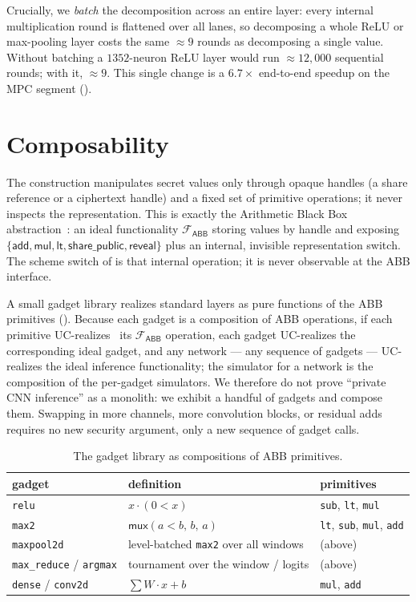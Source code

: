 \documentclass[11pt]{article}
\theoremstyle{plain}
\theoremstyle{definition}
\theoremstyle{remark}
\newcommand{\Fabb}{\mathcal{F}_{\mathsf{ABB}}}
\newcommand{\bt}[1]{\texttt{#1}}
\begin{document}
Crucially, we \emph{batch} the decomposition across an entire layer: every
internal multiplication round is flattened over all lanes, so decomposing a
whole ReLU or max-pooling layer costs the same $\approx 9$ rounds as
decomposing a single value. Without batching a $1352$-neuron ReLU layer
would run $\approx 12{,}000$ sequential rounds; with it, $\approx 9$. This
single change is a $6.7\times$ end-to-end speedup on the MPC segment
().

\section{Composability}\label{sec:uc}

The construction manipulates secret values only through opaque handles
(a share reference or a ciphertext handle) and a fixed set of primitive
operations; it never inspects the representation. This is exactly the
Arithmetic Black Box abstraction~\cite{DamgardNielsen,SPDZ}: an ideal
functionality $\Fabb$ storing values by handle and exposing
$\{\mathsf{add}, \mathsf{mul}, \mathsf{lt}, \mathsf{share\_public},
\mathsf{reveal}\}$ plus an internal, invisible representation switch. The
scheme switch of  is that internal operation; it is
never observable at the ABB interface.

A small gadget library realizes standard layers as pure functions of the
ABB primitives (). Because each gadget is a composition of
ABB operations, if each primitive UC-realizes~\cite{Canetti} its $\Fabb$
operation, each gadget UC-realizes the corresponding ideal gadget, and any
network --- any sequence of gadgets --- UC-realizes the ideal inference
functionality; the simulator for a network is the composition of the
per-gadget simulators. We therefore do not prove ``private CNN inference''
as a monolith: we exhibit a handful of gadgets and compose them. Swapping in
more channels, more convolution blocks, or residual adds requires no new
security argument, only a new sequence of gadget calls.

\begin{table}[t]
\centering
\caption{The gadget library as compositions of ABB primitives.}
\label{tab:gadgets}
\begin{tabular}{@{}lll@{}}
\toprule
gadget & definition & primitives \\
\midrule
\bt{relu} & $x\cdot(0<x)$ & \bt{sub}, \bt{lt}, \bt{mul} \\
\bt{max2} & $\mathsf{mux}(a<b,\,b,\,a)$ & \bt{lt}, \bt{sub}, \bt{mul}, \bt{add} \\
\bt{maxpool2d} & level-batched \bt{max2} over all windows & (above) \\
\bt{max\_reduce} / \bt{argmax} & tournament over the window / logits & (above) \\
\bt{dense} / \bt{conv2d} & $\sum W\!\cdot\! x + b$ & \bt{mul}, \bt{add} \\
\bottomrule
\end{tabular}
\end{table}
\end{document}
